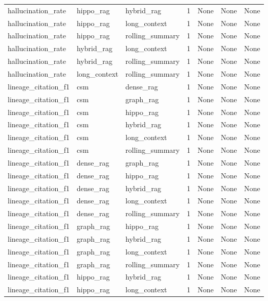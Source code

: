 \begin{tabular}{lllllll}
hallucination\_rate & hippo\_rag & hybrid\_rag & 1 & None & None & None \\
hallucination\_rate & hippo\_rag & long\_context & 1 & None & None & None \\
hallucination\_rate & hippo\_rag & rolling\_summary & 1 & None & None & None \\
hallucination\_rate & hybrid\_rag & long\_context & 1 & None & None & None \\
hallucination\_rate & hybrid\_rag & rolling\_summary & 1 & None & None & None \\
hallucination\_rate & long\_context & rolling\_summary & 1 & None & None & None \\
lineage\_citation\_f1 & csm & dense\_rag & 1 & None & None & None \\
lineage\_citation\_f1 & csm & graph\_rag & 1 & None & None & None \\
lineage\_citation\_f1 & csm & hippo\_rag & 1 & None & None & None \\
lineage\_citation\_f1 & csm & hybrid\_rag & 1 & None & None & None \\
lineage\_citation\_f1 & csm & long\_context & 1 & None & None & None \\
lineage\_citation\_f1 & csm & rolling\_summary & 1 & None & None & None \\
lineage\_citation\_f1 & dense\_rag & graph\_rag & 1 & None & None & None \\
lineage\_citation\_f1 & dense\_rag & hippo\_rag & 1 & None & None & None \\
lineage\_citation\_f1 & dense\_rag & hybrid\_rag & 1 & None & None & None \\
lineage\_citation\_f1 & dense\_rag & long\_context & 1 & None & None & None \\
lineage\_citation\_f1 & dense\_rag & rolling\_summary & 1 & None & None & None \\
lineage\_citation\_f1 & graph\_rag & hippo\_rag & 1 & None & None & None \\
lineage\_citation\_f1 & graph\_rag & hybrid\_rag & 1 & None & None & None \\
lineage\_citation\_f1 & graph\_rag & long\_context & 1 & None & None & None \\
lineage\_citation\_f1 & graph\_rag & rolling\_summary & 1 & None & None & None \\
lineage\_citation\_f1 & hippo\_rag & hybrid\_rag & 1 & None & None & None \\
lineage\_citation\_f1 & hippo\_rag & long\_context & 1 & None & None & None \\

\end{tabular}
